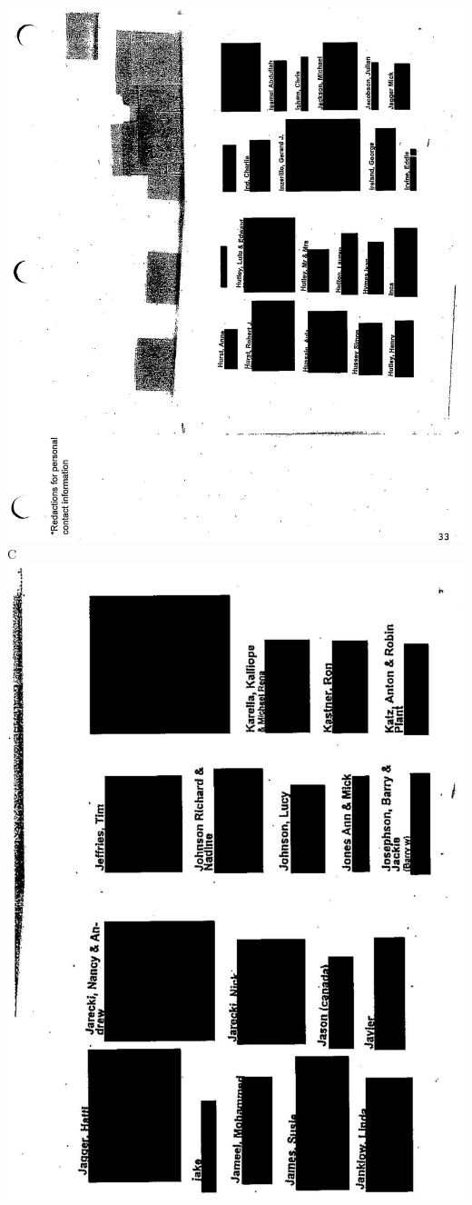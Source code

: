 \documentclass[10pt]{article}
\begin{document}
\includegraphics[max width=\textwidth, center]{2025_02_27_dd68c3d38de88f0516d9g-150}\\
C\\
\includegraphics[max width=\textwidth, center]{2025_02_27_dd68c3d38de88f0516d9g-151}\\
\end{document}
